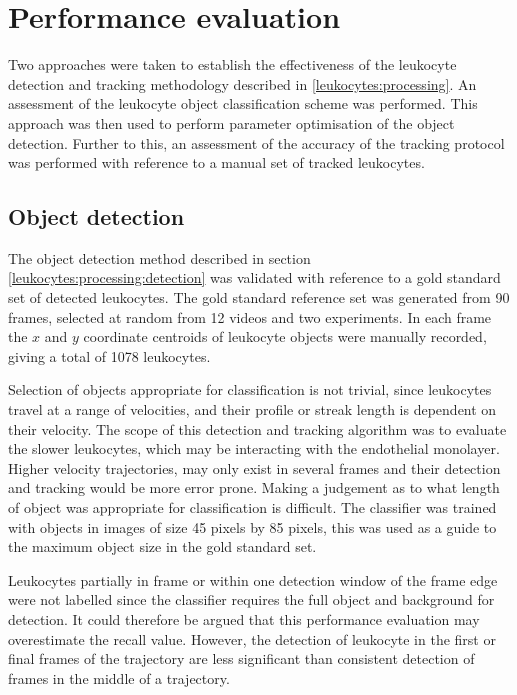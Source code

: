 \section{Performance evaluation}
\label{leukocytes:validation}
Two approaches were taken to establish the effectiveness of the leukocyte detection and tracking methodology described in \autoref{leukocytes:processing}. An assessment of the leukocyte object classification scheme was performed. This approach was then used to perform parameter optimisation of the object detection. Further to this, an assessment of the accuracy of the tracking protocol was performed with reference to a manual set of tracked leukocytes.

\subsection{Object detection}
\label{leukocytes:validation:object_detection}
The object detection method described in section \autoref{leukocytes:processing:detection} was validated with reference to a gold standard set of detected leukocytes. The gold standard reference set was generated from 90 frames, selected at random from 12 videos and two experiments. In each frame the $x$ and $y$ coordinate centroids of leukocyte objects were manually recorded, giving a total of 1078 leukocytes.

Selection of objects appropriate for classification is not trivial, since leukocytes travel at a range of velocities, and their profile or streak length is dependent on their velocity. The scope of this detection and tracking algorithm was to evaluate the slower leukocytes, which may be interacting with the endothelial monolayer. Higher velocity trajectories, may only exist in several frames and their detection and tracking would be more error prone. Making a judgement as to what length of object was appropriate for classification is difficult. The classifier was trained with objects in images of size 45 pixels by 85 pixels, this was used as a guide to the maximum object size in the gold standard set.

Leukocytes partially in frame or within one detection window of the frame edge were not labelled since the classifier requires the full object and background for detection. It could therefore be argued that this performance evaluation may overestimate the recall value. However, the detection of leukocyte in the first or final frames of the trajectory are less significant than consistent detection of frames in the middle of a trajectory.

